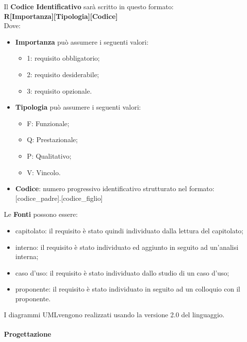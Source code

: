 Il \textbf{Codice Identificativo} sarà scritto in questo formato: \\
\textbf{R[Importanza][Tipologia][Codice]} \\
Dove:
\begin{itemize}
	\item \textbf{Importanza} può assumere i seguenti valori:
	\begin{itemize}
		\item 1: requisito obbligatorio;
		\item 2: requisito desiderabile;
		\item 3: requisito opzionale.
	\end{itemize}
	\item \textbf{Tipologia} può assumere i seguenti valori:
	\begin{itemize}
		\item F: Funzionale;
		\item Q: Prestazionale;
		\item P: Qualitativo;
		\item V: Vincolo.
	\end{itemize}
	\item\textbf{Codice}: numero progressivo identificativo strutturato nel formato: [codice\_padre].[codice\_figlio]
\end{itemize}
Le \textbf{Fonti} possono essere:
\begin{itemize}
	\item capitolato\glo: il requisito è stato quindi individuato dalla lettura del capitolato\glo;
	\item interno: il requisito è stato individuato ed aggiunto in seguito ad un'analisi interna;
	\item caso d'uso\glo: il requisito è stato individuato dallo studio di un caso d'uso\glo;
	\item proponente: il requisito è stato individuato in seguito ad un colloquio con il proponente.
\end{itemize}
I diagrammi UML\glosp vengono realizzati usando la versione 2.0 del linguaggio.\pagebreak
\paragraph{Progettazione}
